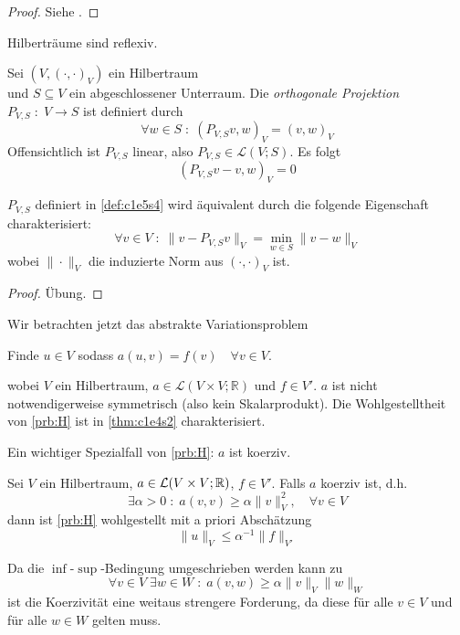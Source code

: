 \documentclass[../skript.tex]{subfiles}
\begin{document}
\begin{proof}
	Siehe \cite[S.~90]{Yosida}.
\end{proof}

\begin{corollary} %
\label{thm:c1e5s3}
	Hilberträume sind reflexiv.
\end{corollary}

\begin{definition}
\label{def:c1e5s4}
	Sei $(V,(\cdot,\cdot)_V)$ ein Hilbertraum \\ und $S\subseteq V$ ein abgeschlossener Unterraum. Die \emph{orthogonale Projektion} $P_{V,S} \; : \; V\to S$ ist definiert durch
	\[
		\forall w\in S \; : \; \left(P_{V,S}v,w\right)_V = \left(v,w\right)_V
	\]
	Offensichtlich ist $P_{V,S}$ linear, also $P_{V,S}\in\mathcal{L}(V;S)$. Es folgt
	\[
		\left(P_{V,S}v-v,w\right)_V = 0
	\]
\end{definition}


\begin{proposition} %
\label{prop:c1e5s5}
	$P_{V,S}$ definiert in \cref{def:c1e5s4} wird äquivalent durch die folgende Eigenschaft charakterisiert:
	\[
		\forall v\in V\;:\;\| v-P_{V,S}v \|_V = \min_{w\in S} \| v-w \|_V 
	\]
	wobei $\|\cdot\|_V$ die induzierte Norm aus $(\cdot,\cdot)_V$ ist. 
\end{proposition}

\begin{proof}
	Übung.
\end{proof}

Wir betrachten jetzt das abstrakte Variationsproblem
\begin{problem} %
\label{prb:H}
Finde $u \in V$ sodass $a(u, v) = f(v) \quad \forall v \in V$.
\end{problem}
wobei $V$ ein Hilbertraum, $a\in\mathcal{L}(V\times V;\mathbb{R})$ und $f\in V'$. $a$ ist nicht notwendigerweise symmetrisch (also kein Skalarprodukt).
Die Wohlgestelltheit von \cref{prb:H} ist in \cref{thm:c1e4s2} charakterisiert.

Ein wichtiger Spezialfall von \cref{prb:H}: $a$ ist koerziv.

\begin{theorem}
\label{thm:c1e5s6}
	Sei $V$ ein Hilbertraum, $a\in\mathcal{L}(V\times V;\mathbb{R})$, $f\in V'$. Falls $a$ koerziv ist, d.h.
	\[
		\exists\alpha > 0 \; : \; a(v,v)\geq\alpha\|v\|_V^2,\quad\forall v\in V
	\]
	dann ist \cref{prb:H} wohlgestellt mit a priori Abschätzung
	\[
		\|u\|_V \leq\alpha^{-1}\|f\|_{V'}
	\]
\end{theorem}
Da die $\inf$-$\sup$-Bedingung umgeschrieben werden kann zu
\[
	\forall v\in V\;\exists w\in W \; :\;a(v,w)\geq\alpha\|v\|_V \| w \|_W
\]
ist die Koerzivität eine weitaus strengere Forderung, da diese für alle $v\in V$ und für alle $w\in W$ gelten muss.
\end{document}
